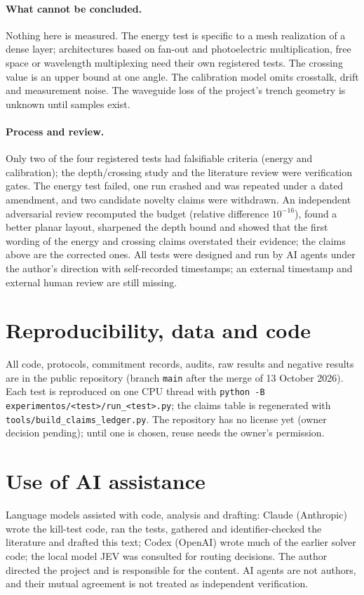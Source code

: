 \documentclass[10pt,a4paper]{article}
\begin{document}
\paragraph{What cannot be concluded.} Nothing here is measured. The energy test is specific to a mesh realization of a dense layer; architectures based on fan-out and photoelectric multiplication, free space or wavelength multiplexing need their own registered tests. The crossing value is an upper bound at one angle. The calibration model omits crosstalk, drift and measurement noise. The waveguide loss of the project's trench geometry is unknown until samples exist.

\paragraph{Process and review.} Only two of the four registered tests had falsifiable criteria (energy and calibration); the depth/crossing study and the literature review were verification gates. The energy test failed, one run crashed and was repeated under a dated amendment, and two candidate novelty claims were withdrawn. An independent adversarial review recomputed the budget (relative difference $10^{-16}$), found a better planar layout, sharpened the depth bound and showed that the first wording of the energy and crossing claims overstated their evidence; the claims above are the corrected ones. All tests were designed and run by AI agents under the author's direction with self-recorded timestamps; an external timestamp and external human review are still missing.


\section*{Reproducibility, data and code}
All code, protocols, commitment records, audits, raw results and negative results are in the public repository (branch \texttt{main} after the merge of 13 October 2026). Each test is reproduced on one CPU thread with \texttt{python -B experimentos/<test>/run\_<test>.py}; the claims table is regenerated with \texttt{tools/build\_claims\_ledger.py}. The repository has no license yet (owner decision pending); until one is chosen, reuse needs the owner's permission.

\section*{Use of AI assistance}
Language models assisted with code, analysis and drafting: Claude (Anthropic) wrote the kill-test code, ran the tests, gathered and identifier-checked the literature and drafted this text; Codex (OpenAI) wrote much of the earlier solver code; the local model JEV was consulted for routing decisions. The author directed the project and is responsible for the content. AI agents are not authors, and their mutual agreement is not treated as independent verification.
\end{document}
